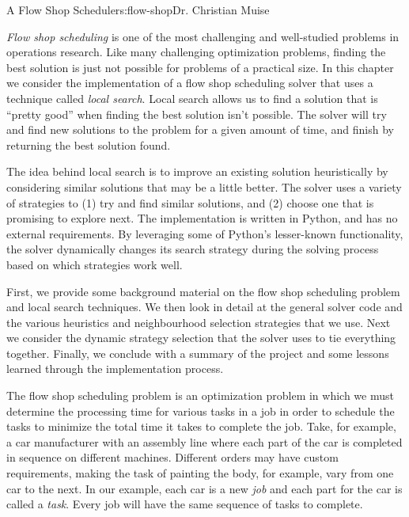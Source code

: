 \begin{aosachapter}{A Flow Shop Scheduler}{s:flow-shop}{Dr. Christian Muise}

\label{a-flow-shop-scheduler}

\emph{Flow shop scheduling} is one of the most challenging and
well-studied problems in operations research. Like many challenging
optimization problems, finding the best solution is just not possible
for problems of a practical size. In this chapter we consider the
implementation of a flow shop scheduling solver that uses a technique
called \emph{local search}. Local search allows us to find a solution
that is ``pretty good'' when finding the best solution isn't possible.
The solver will try and find new solutions to the problem for a given
amount of time, and finish by returning the best solution found.

The idea behind local search is to improve an existing solution
heuristically by considering similar solutions that may be a little
better. The solver uses a variety of strategies to (1) try and find
similar solutions, and (2) choose one that is promising to explore next.
The implementation is written in Python, and has no external
requirements. By leveraging some of Python's lesser-known functionality,
the solver dynamically changes its search strategy during the solving
process based on which strategies work well.

First, we provide some background material on the flow shop scheduling
problem and local search techniques. We then look in detail at the
general solver code and the various heuristics and neighbourhood
selection strategies that we use. Next we consider the dynamic strategy
selection that the solver uses to tie everything together. Finally, we
conclude with a summary of the project and some lessons learned through
the implementation process.

\label{background}

\label{flow-shop-scheduling}

The flow shop scheduling problem is an optimization problem in which we
must determine the processing time for various tasks in a job in order
to schedule the tasks to minimize the total time it takes to complete
the job. Take, for example, a car manufacturer with an assembly line
where each part of the car is completed in sequence on different
machines. Different orders may have custom requirements, making the task
of painting the body, for example, vary from one car to the next. In our
example, each car is a new \emph{job} and each part for the car is
called a \emph{task}. Every job will have the same sequence of tasks to
complete.


\end{aosachapter}
